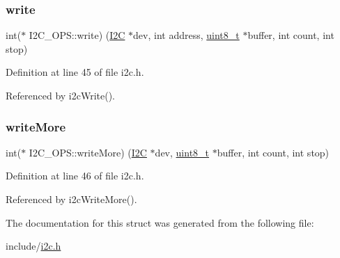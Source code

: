 \subsubsection{\texorpdfstring{write}{write}}
{\footnotesize\ttfamily int($\ast$ I2\+C\+\_\+\+O\+P\+S\+::write) (\mbox{\hyperlink{structI2C}{I2C}} $\ast$dev, int address, \mbox{\hyperlink{stdint_8h_aba7bc1797add20fe3efdf37ced1182c5}{uint8\+\_\+t}} $\ast$buffer, int count, int stop)}



Definition at line 45 of file i2c.\+h.



Referenced by i2c\+Write().

\mbox{\label{structI2C__OPS_a582c8913180598f905a1053c0e307e20}} 
\subsubsection{\texorpdfstring{writeMore}{writeMore}}
{\footnotesize\ttfamily int($\ast$ I2\+C\+\_\+\+O\+P\+S\+::write\+More) (\mbox{\hyperlink{structI2C}{I2C}} $\ast$dev, \mbox{\hyperlink{stdint_8h_aba7bc1797add20fe3efdf37ced1182c5}{uint8\+\_\+t}} $\ast$buffer, int count, int stop)}



Definition at line 46 of file i2c.\+h.



Referenced by i2c\+Write\+More().



The documentation for this struct was generated from the following file\+:\begin{DoxyCompactItemize}
\item 
include/\mbox{\hyperlink{i2c_8h}{i2c.\+h}}\end{DoxyCompactItemize}
